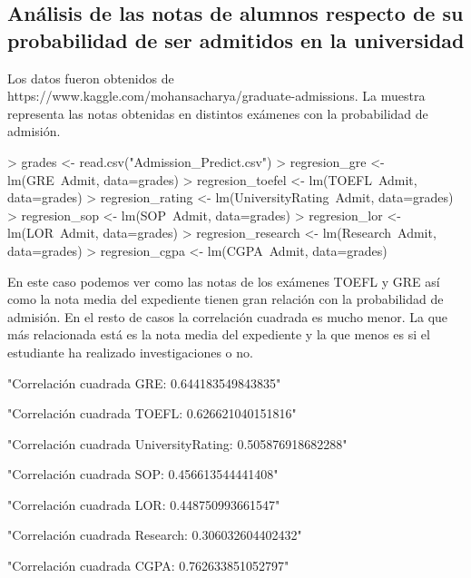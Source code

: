 \documentclass [a4paper] {article}
\begin{document}
\subsection{Análisis de las notas de alumnos respecto de su probabilidad de ser admitidos en la universidad}
Los datos fueron obtenidos de https://www.kaggle.com/mohansacharya/graduate-admissions.
La muestra representa las notas obtenidas en distintos exámenes con la probabilidad de admisión.
\begin{Schunk}
\begin{Sinput}
> grades <- read.csv("Admission_Predict.csv")
> regresion_gre <- lm(GRE~Admit, data=grades)
> regresion_toefel <- lm(TOEFL~Admit, data=grades)
> regresion_rating <- lm(UniversityRating~Admit, data=grades)
> regresion_sop <- lm(SOP~Admit, data=grades)
> regresion_lor <- lm(LOR~Admit, data=grades)
> regresion_research <- lm(Research~Admit, data=grades)
> regresion_cgpa <- lm(CGPA~Admit, data=grades)
\end{Sinput}
\end{Schunk}
En este caso podemos ver como las notas de los exámenes TOEFL y GRE así como la nota media del expediente tienen gran relación con la probabilidad de admisión.
En el resto de casos la correlación cuadrada es mucho menor.
La que más relacionada está es la nota media del expediente y la que menos es si el estudiante ha realizado investigaciones o no.
\begin{Schunk}
\begin{Soutput}
[1] "Correlación cuadrada GRE: 0.644183549843835"
\end{Soutput}
\begin{Soutput}
[1] "Correlación cuadrada TOEFL: 0.626621040151816"
\end{Soutput}
\begin{Soutput}
[1] "Correlación cuadrada UniversityRating: 0.505876918682288"
\end{Soutput}
\begin{Soutput}
[1] "Correlación cuadrada SOP: 0.456613544441408"
\end{Soutput}
\begin{Soutput}
[1] "Correlación cuadrada LOR: 0.448750993661547"
\end{Soutput}
\begin{Soutput}
[1] "Correlación cuadrada Research: 0.306032604402432"
\end{Soutput}
\begin{Soutput}
[1] "Correlación cuadrada CGPA: 0.762633851052797"
\end{Soutput}
\end{Schunk}
\end{document}
